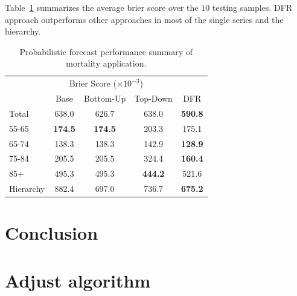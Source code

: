 \documentclass[a4paper,review,12pt,authoryear]{elsarticle}
\begin{document}
Table~\ref{tab:mortality_age} summarizes the average brier score over the $10$ testing samples. 
DFR approach outperforms other approaches in most of the single series and the hierarchy. 


\begin{table}
  \centering
  \caption{\label{tab:mortality_age} Probabilistic forecast performance summary of mortality application.}
  \begin{tabular}{lcccc}
  \toprule
  \multicolumn{5}{c}{Brier Score ($\times 10^{-3}$)}\\ 
  & Base & Bottom-Up & Top-Down & DFR \\\midrule
  Total & 638.0 & 626.7 & 638.0 & \textbf{590.8} \\
  55-65 & \textbf{174.5} & \textbf{174.5} & 203.3 & 175.1 \\
  65-74 & 138.3 & 138.3 & 142.9 & \textbf{128.9}\\
  75-84 & 205.5 & 205.5 & 324.4 & \textbf{160.4}\\
  85+ & 495.3 & 495.3 & \textbf{444.2} & 521.6\\
  Hierarchy & 882.4 & 697.0 & 736.7 & \textbf{675.2} \\
  \bottomrule
 \end{tabular}
\end{table}

\section{Conclusion}
\label{sec:conclusion}

\newpage

\appendix
\section{Adjust algorithm}
\label{appendix:adjust}


\newpage



\end{document}
